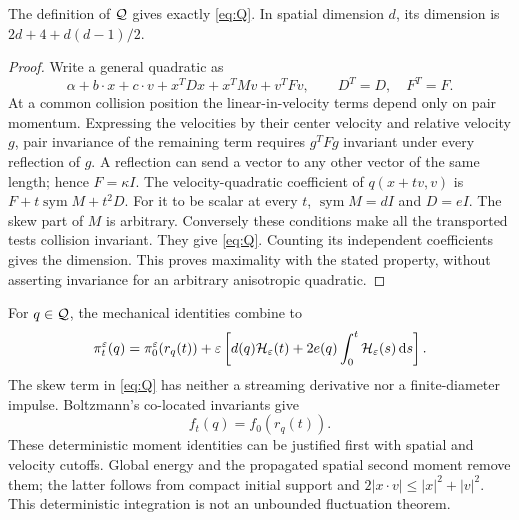 \begin{proposition}
\label{prop:maximal}
The definition of $\mathcal Q$ gives exactly \eqref{eq:Q}. In spatial dimension
$d$, its dimension is $2d+4+d(d-1)/2$.
\end{proposition}
\begin{proof}
Write a general quadratic as
\[
 \alpha+b\cdot x+c\cdot v+x^TDx+x^TMv+v^TFv,
 \qquad D^T=D,\quad F^T=F.
\]
At a common collision position the linear-in-velocity terms depend only
on pair momentum. Expressing the velocities by their center velocity and
relative velocity $g$, pair invariance of the remaining term requires
$g^TFg$ invariant under every reflection of $g$. A reflection can send a
vector to any other vector of the same length; hence $F=\kappa I$.
The velocity-quadratic coefficient of $q(x+tv,v)$ is
$F+t\operatorname{sym}M+t^2D$. For it to be scalar at every $t$,
$\operatorname{sym}M=dI$ and $D=eI$. The skew part of $M$ is arbitrary.
Conversely these conditions make all the transported tests collision
invariant. They give \eqref{eq:Q}. Counting its independent coefficients
gives the dimension. This proves maximality with the stated property,
without asserting invariance for an arbitrary anisotropic quadratic.
\end{proof}

For $q\in\mathcal Q$, the mechanical identities combine to
\begin{equation}\label{eq:Q-identity}
 \pi_t^\varepsilon(q)=\pi_0^\varepsilon(r_q(t))
 +\varepsilon\left[d(q)\mathcal H_\varepsilon(t)+2e(q)\int_0^t\mathcal H_\varepsilon(s)\,\mathrm d s\right].
\end{equation}
The skew term in \eqref{eq:Q} has neither a streaming derivative nor a
finite-diameter impulse. Boltzmann's co-located invariants give
\begin{equation}\label{eq:Bol-Q}
 f_t(q)=f_0(r_q(t)).
\end{equation}
These deterministic moment identities can be justified first with spatial
and velocity cutoffs. Global energy and the propagated spatial second
moment remove them; the latter follows from compact initial support and
$2|x\cdot v|\le|x|^2+|v|^2$. This deterministic integration is not an
unbounded fluctuation theorem.

